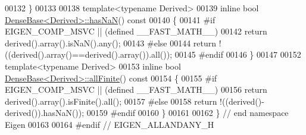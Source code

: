 \begin{DoxyCode}
00132 \}
00133 
00138 \textcolor{keyword}{template}<\textcolor{keyword}{typename} Derived>
00139 \textcolor{keyword}{inline} \textcolor{keywordtype}{bool} \hyperlink{group___core___module_ab13d158c900560d3e1b25d85d2d33dd6}{DenseBase<Derived>::hasNaN}()\textcolor{keyword}{ const}
00140 \textcolor{keyword}{}\{
00141 \textcolor{preprocessor}{#if EIGEN\_COMP\_MSVC || (defined \_\_FAST\_MATH\_\_)}
00142   \textcolor{keywordflow}{return} derived().array().isNaN().any();
00143 \textcolor{preprocessor}{#else}
00144   \textcolor{keywordflow}{return} !((derived().array()==derived().array()).all());
00145 \textcolor{preprocessor}{#endif}
00146 \}
00147 
00152 \textcolor{keyword}{template}<\textcolor{keyword}{typename} Derived>
00153 \textcolor{keyword}{inline} \textcolor{keywordtype}{bool} \hyperlink{group___core___module_af1e669fd3aaae50a4870dc1b8f3b8884}{DenseBase<Derived>::allFinite}()\textcolor{keyword}{ const}
00154 \textcolor{keyword}{}\{
00155 \textcolor{preprocessor}{#if EIGEN\_COMP\_MSVC || (defined \_\_FAST\_MATH\_\_)}
00156   \textcolor{keywordflow}{return} derived().array().isFinite().all();
00157 \textcolor{preprocessor}{#else}
00158   \textcolor{keywordflow}{return} !((derived()-derived()).hasNaN());
00159 \textcolor{preprocessor}{#endif}
00160 \}
00161     
00162 \} \textcolor{comment}{// end namespace Eigen}
00163 
00164 \textcolor{preprocessor}{#endif // EIGEN\_ALLANDANY\_H}
\end{DoxyCode}
